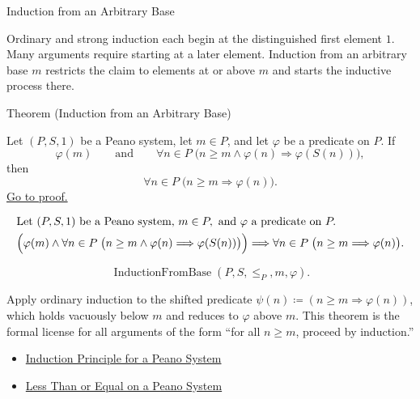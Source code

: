 \label{sec:induction-principles}

\begin{topicbox}{Induction from an Arbitrary Base}
\begin{exposition}
Ordinary and strong induction each begin at the distinguished first element
$1$. Many arguments require starting at a later element. Induction from an
arbitrary base $m$ restricts the claim to elements at or above $m$ and
starts the inductive process there.
\end{exposition}

\begin{theorembox}{Theorem (Induction from an Arbitrary Base)}
\begin{theorem}
\label{thm:induction-from-arbitrary-base}
Let $(P,S,1)$ be a Peano system, let $m \in P$, and let $\varphi$ be a
predicate on $P$. If
\[
\varphi(m)
\qquad\text{and}\qquad
\forall n \in P\;\bigl(n \ge m \land \varphi(n) \Longrightarrow \varphi(S(n))\bigr),
\]
then
\[
\forall n \in P\;\bigl(n \ge m \Longrightarrow \varphi(n)\bigr).
\]
\hyperref[prf:induction-from-arbitrary-base]{Go to proof.}
\end{theorem}
\end{theorembox}

\begin{remark*}
\[
\begin{aligned}
&\text{Let } (P,S,1) \text{ be a Peano system, } m \in P,
\text{ and } \varphi \text{ a predicate on } P.\\
&\Bigl(\varphi(m) \land
\forall n \in P\;\bigl(n \ge m \land \varphi(n)
\Longrightarrow \varphi(S(n))\bigr)\Bigr)
\Longrightarrow
\forall n \in P\;\bigl(n \ge m \Longrightarrow \varphi(n)\bigr).
\end{aligned}
\]
\end{remark*}

\begin{remark*}
\[
\operatorname{InductionFromBase}(P,S,\leq_P,m,\varphi).
\]
\end{remark*}

\begin{remark*}[Interpretation]
Apply ordinary induction to the shifted predicate $\psi(n) \coloneqq
(n \ge m \Longrightarrow \varphi(n))$, which holds vacuously below $m$
and reduces to $\varphi$ above $m$. This theorem is the formal license for
all arguments of the form ``for all $n \ge m$, proceed by induction.''
\end{remark*}

\begin{dependencies}
\begin{itemize}
  \item \hyperref[thm:induction-principle-for-peano-system]{Induction Principle for a Peano System}
  \item \hyperref[def:less-than-or-equal-on-peano-system]{Less Than or Equal on a Peano System}
\end{itemize}
\end{dependencies}
\end{topicbox}

